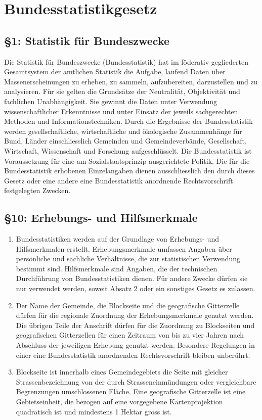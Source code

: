 \chapter[BStatG]{Bundesstatistikgesetz}
\minitoc
    \section{\S 1: Statistik für Bundeszwecke} 
    Die Statistik für Bundeszwecke (Bundesstatistik) hat im föderativ gegliederten Gesamtsystem der amtlichen Statistik die Aufgabe, laufend Daten über Massenerscheinungen zu erheben, zu sammeln, aufzubereiten, darzustellen und zu analysieren. Für sie gelten die Grundsätze der Neutralität, Objektivität und fachlichen Unabhängigkeit. Sie gewinnt die Daten unter Verwendung wissenschaftlicher Erkenntnisse und unter Einsatz der jeweils sachgerechten Methoden und Informationstechniken. Durch die Ergebnisse der Bundesstatistik werden gesellschaftliche, wirtschaftliche und ökologische Zusammenhänge für Bund, Länder einschliesslich Gemeinden und Gemeindeverbände, Gesellschaft, Wirtschaft, Wissenschaft und Forschung aufgeschlüsselt. Die Bundesstatistik ist Voraussetzung für eine am Sozialstaatsprinzip ausgerichtete Politik. Die für die Bundesstatistik erhobenen Einzelangaben dienen ausschliesslich den durch dieses Gesetz oder eine andere eine Bundesstatistik anordnende Rechtsvorschrift festgelegten Zwecken.
    \section{\S 10: Erhebungs- und Hilfsmerkmale}
        \begin{enumerate}[label=(\arabic*)]
            \item Bundesstatistiken werden auf der Grundlage von Erhebungs- und Hilfsmerkmalen erstellt. Erhebungsmerkmale umfassen Angaben über persönliche und sachliche Verhältnisse, die zur statistischen Verwendung bestimmt sind. Hilfsmerkmale sind Angaben, die der technischen Durchführung von Bundesstatistiken dienen. Für andere Zwecke dürfen sie nur verwendet werden, soweit Absatz 2 oder ein sonstiges Gesetz es zulassen.
            \item Der Name der Gemeinde, die Blockseite und die geografische Gitterzelle dürfen für die regionale Zuordnung der Erhebungsmerkmale genutzt werden. Die übrigen Teile der Anschrift dürfen für die Zuordnung zu Blockseiten und geografischen Gitterzellen für einen Zeitraum von bis zu vier Jahren nach Abschluss der jeweiligen Erhebung genutzt werden. Besondere Regelungen in einer eine Bundesstatistik anordnenden Rechtsvorschrift bleiben unberührt.
            \item Blockseite ist innerhalb eines Gemeindegebiets die Seite mit gleicher Strassenbezeichnung von der durch Strasseneinmündungen oder vergleichbare Begrenzungen umschlossenen Fläche. Eine geografische Gitterzelle ist eine Gebietseinheit, die bezogen auf eine vorgegebene Kartenprojektion quadratisch ist und mindestens 1 Hektar gross ist.
        \end{enumerate}
